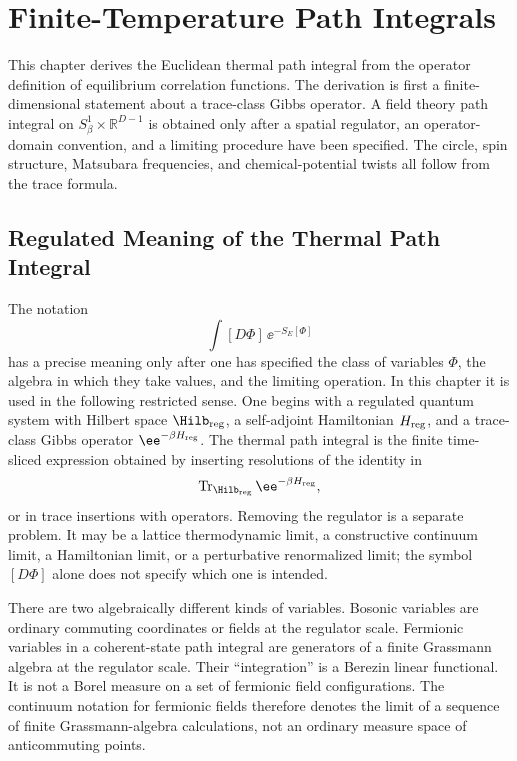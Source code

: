 \chapter{Finite-Temperature Path Integrals}
\label{ch:finite-temperature-path-integrals}

\ConventionsEuclidean

This chapter derives the Euclidean thermal path integral from the operator
definition of equilibrium correlation functions.  The derivation is first a
finite-dimensional statement about a trace-class Gibbs operator.  A field
theory path integral on \(S^1_\beta\times\mathbb R^{D-1}\) is obtained only
after a spatial regulator, an operator-domain convention, and a limiting
procedure have been specified.  The circle, spin structure, Matsubara
frequencies, and chemical-potential twists all follow from the trace formula.

\section{Regulated Meaning of the Thermal Path Integral}

The notation
\[
  \int [D\Phi]\,\ee^{-S_E[\Phi]}
\]
has a precise meaning only after one has specified the class of variables
\(\Phi\), the algebra in which they take values, and the limiting operation.
In this chapter it is used in the following restricted sense.  One begins
with a regulated quantum system with Hilbert space \(\Hilb_{\rm reg}\), a
self-adjoint Hamiltonian \(H_{\rm reg}\), and a trace-class Gibbs operator
\(\ee^{-\beta H_{\rm reg}}\).  The thermal path integral is the finite
time-sliced expression obtained by inserting resolutions of the identity in
\begin{equation}
  \operatorname{Tr}_{\Hilb_{\rm reg}}\ee^{-\beta H_{\rm reg}},
  \label{eq:regulated-thermal-trace-start}
\end{equation}
or in trace insertions with operators.  Removing the regulator is a separate
problem.  It may be a lattice thermodynamic limit, a constructive continuum
limit, a Hamiltonian limit, or a perturbative renormalized limit; the symbol
\([D\Phi]\) alone does not specify which one is intended.

There are two algebraically different kinds of variables.  Bosonic variables
are ordinary commuting coordinates or fields at the regulator scale.
Fermionic variables in a coherent-state path integral are generators of a
finite Grassmann algebra at the regulator scale.  Their ``integration'' is a
Berezin linear functional.  It is not a Borel measure on a set of fermionic
field configurations.  The continuum notation for fermionic fields therefore
denotes the limit of a sequence of finite Grassmann-algebra calculations, not
an ordinary measure space of anticommuting points.


